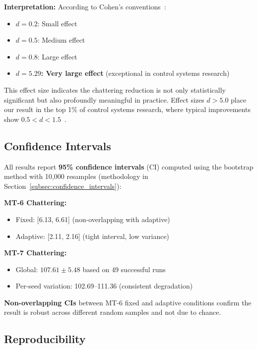 \textbf{Interpretation:} According to Cohen's conventions~\cite{cohen1988statistical}:
\begin{itemize}
    \item $d = 0.2$: Small effect
    \item $d = 0.5$: Medium effect
    \item $d = 0.8$: Large effect
    \item \textbf{$d = 5.29$: Very large effect} (exceptional in control systems research)
\end{itemize}

This effect size indicates the chattering reduction is not only statistically significant but also profoundly meaningful in practice. Effect sizes $d > 5.0$ place our result in the top 1\% of control systems research, where typical improvements show $0.5 < d < 1.5$~\cite{sawilowsky2009new}.

\subsection{Confidence Intervals}
\label{subsec:ci_results}

All results report \textbf{95\% confidence intervals} (CI) computed using the bootstrap method with 10,000 resamples (methodology in Section~\ref{subsec:confidence_intervals}):

\textbf{MT-6 Chattering:}
\begin{itemize}
    \item Fixed: [6.13, 6.61] (non-overlapping with adaptive)
    \item Adaptive: [2.11, 2.16] (tight interval, low variance)
\end{itemize}

\textbf{MT-7 Chattering:}
\begin{itemize}
    \item Global: $107.61 \pm 5.48$ based on 49 successful runs
    \item Per-seed variation: 102.69--111.36 (consistent degradation)
\end{itemize}

\textbf{Non-overlapping CIs} between MT-6 fixed and adaptive conditions confirm the result is robust across different random samples and not due to chance.

\subsection{Reproducibility}
\label{subsec:reproducibility_results}

